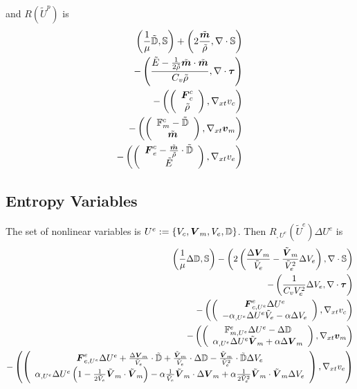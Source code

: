 \documentclass{article}
\begin{document}
and $R(\tilde U^p)$ is
\begin{align*}
	\left( \frac{1}{\mu}\tilde{\mathbb{D}},\mathbb{S} \right)+\left( 2\frac{\tilde{\boldsymbol m}}{\tilde\rho},\nabla\cdot\mathbb{S} \right)\\
	-\left( \frac{\tilde E-\frac{1}{2\tilde\rho}\tilde{\boldsymbol m}\cdot\tilde{\boldsymbol m}}{C_v\tilde\rho},\nabla\cdot\boldsymbol\tau \right)\\
	-\left( \left( \begin{array}{c} \boldsymbol F^c_c\\ \tilde\rho\\ \end{array} \right),\nabla_{xt} v_c \right)\\
	-\left( \left( \begin{array}{c} \mathbb{F}^c_m-\tilde{\mathbb{D}}\\ \tilde{\boldsymbol m}\\ \end{array} \right),\nabla_{xt}\boldsymbol v_m \right)\\
	-\left( \left( \begin{array}{c} \boldsymbol F^c_e-\frac{\tilde{\boldsymbol m}}{\tilde\rho}\cdot\tilde{\mathbb{D}}\\ \tilde E\\ \end{array} \right),\nabla_{xt} v_e \right)
\end{align*}

\subsection*{Entropy Variables}
The set of nonlinear variables is $U^e:=\left\{ V_c,\boldsymbol V_m,V_e,\mathbb{D} \right\}$.
Then $R_{,U^e}(\tilde U^e)\Delta U^e$ is
\begin{align*}
	\left( \frac{1}{\mu}\Delta\mathbb{D},\mathbb{S} \right)
	-\left( 2\left( \frac{\Delta\boldsymbol V_m}{\tilde V_e}-\frac{\tilde{\boldsymbol V}_m}{\tilde V_e^2}\Delta V_e \right),\nabla\cdot\mathbb{S} \right)\\
	-\left( \frac{1}{C_vV_e^2}\Delta V_e,\nabla\cdot\boldsymbol\tau \right)\\
	-\left( \left( \begin{array}{c} \boldsymbol F^e_{c,U^e}\Delta U^e\\ -\alpha_{,U^e}\Delta U^e \tilde V_e-\alpha\Delta V_e\\ \end{array} \right),\nabla_{xt} v_c \right)\\
	-\left( \left( \begin{array}{c} \mathbb{F}^e_{m,U^e}\Delta U^e-\Delta\mathbb{D}\\ \alpha_{,U^e}\Delta U^e\tilde{\boldsymbol V}_m+\alpha\Delta\boldsymbol V_m\\ \end{array} \right),\nabla_{xt}\boldsymbol v_m \right)\\
	-\left( \left( \begin{array}{c} \boldsymbol F^e_{e,U^e}\Delta U^e
	+\frac{\Delta\boldsymbol V_m}{\tilde V_e}\cdot\tilde{\mathbb{D}}
	+\frac{\tilde{\boldsymbol V}_m}{\tilde V_e}\cdot\Delta{\mathbb{D}}
	-\frac{\tilde{\boldsymbol V}_m}{\tilde V_e^2}\cdot\tilde{\mathbb{D}}\Delta V_e
	\\ \alpha_{,U^e}\Delta U^e\left( 1-\frac{1}{2\tilde V_e}\tilde{\boldsymbol V}_m\cdot\tilde{\boldsymbol V}_m \right)
	-\alpha\frac{1}{\tilde V_e}\tilde{\boldsymbol V}_m\cdot\Delta\boldsymbol V_m
	+\alpha\frac{1}{2\tilde V_e^2}\tilde{\boldsymbol V}_m\cdot\tilde{\boldsymbol V}_m\Delta V_e
	\\ \end{array} \right),\nabla_{xt} v_e \right)
\end{align*}
\end{document}
